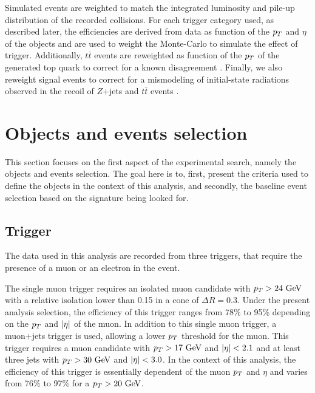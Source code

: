     Simulated events are weighted to match the integrated luminosity and pile-up distribution
    of the recorded collisions. For each trigger category used, as described later, the
    efficiencies are derived from data as function of the $p_T$ and $\eta$ of the objects
    and are used to weight the Monte-Carlo to simulate the effect of trigger. Additionally,
    $t\bar{t}$ events are reweighted as function of the $p_T$ of the generated top quark
    to correct for a known disagreement \cite{topPtReweighting}. Finally, we also reweight
    signal events to correct for a mismodeling of initial-state radiations observed in the
    recoil of $Z$+jets and $t\bar{t}$ events \cite{ISRmodelingDominick}.

    \section{Objects and events selection \label{sec:analysis_objectAndEventSelection}}

    This section focuses on the first aspect of the experimental search, namely the objects
    and events selection. The goal here is to, first, present the criteria used to define the
    objects in the context of this analysis, and secondly, the baseline event selection based
    on the signature being looked for.

        \subsection{Trigger}

    The data used in this analysis are recorded from three triggers, that require the
    presence of a muon or an electron in the event.

    The single muon trigger requires an isolated muon candidate with $p_T > 24~\text{GeV}$
    with a relative isolation lower than 0.15 in a cone of $\Delta R = 0.3$. Under the present
    analysis selection, the efficiency of this trigger ranges from 78\% to 95\% depending
    on the $p_T$ and $\left| \eta \right|$ of the muon. In addition to this single muon trigger, a
    muon+jets trigger is used, allowing a lower $p_T$ threshold for the muon. This trigger
    requires a muon candidate with $p_T > 17~\text{GeV}$ and $\left| \eta \right| < 2.1$ and at least three
    jets with $p_T > 30~\text{GeV}$ and $\left| \eta \right| < 3.0$. In the context of this analysis, the
    efficiency of this trigger is essentially dependent of the muon $p_T$ and $\eta$ and
    varies from 76\% to 97\% for a $p_T > 20~\text{GeV}$.

